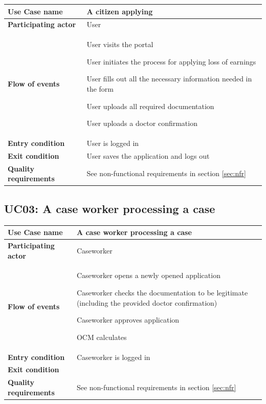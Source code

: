 \begin{table}[htb!]
\begin{tabularx}{\textwidth}{l|X}
	\textbf{Use Case name} & A citizen applying \\
	\hline
	\textbf{Participating actor} & User\\
	\hline
	\textbf{Flow of events} & 
	    \begin{compactenum}
	        \item User visits the portal
	        \item User initiates the process for applying loss of earnings
	        \item User fills out all the necessary information needed in the form
	        \item User uploads all required documentation
	        \item User uploads a doctor confirmation
	    \end{compactenum}\\
	\hline
	\textbf{Entry condition} & User is logged in\\
	\hline
	\textbf{Exit condition} & User saves the application and logs out\\
	\hline
	\textbf{Quality requirements} & See non-functional requirements in section \ref{sec:nfr}\\
\end{tabularx}
\end{table}
\newpage
\subsection{UC03: A case worker processing a case}
\begin{table}[htb!]
\begin{tabularx}{\textwidth}{l|X}
	\textbf{Use Case name} & A case worker processing a case \\
	\hline
	\textbf{Participating actor} & Caseworker\\
	\hline
	\textbf{Flow of events} &
	\vspace{-2mm}
	    \begin{compactenum}
	        \item Caseworker opens a newly opened application
	        \item Caseworker checks the documentation to be legitimate (including the provided doctor confirmation)
	        \item Caseworker approves application
	        \item OCM calculates 
	    \end{compactenum}\\
	\hline
	\textbf{Entry condition} & Caseworker is logged in\\
	\hline
	\textbf{Exit condition} & \\
	\hline
	\textbf{Quality requirements} & See non-functional requirements in section \ref{sec:nfr}\\
\end{tabularx}
\end{table}